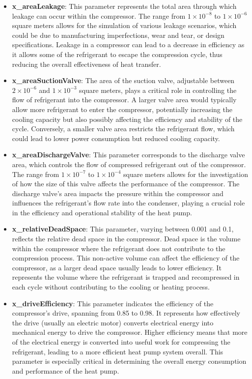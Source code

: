 \documentclass{report}
\begin{document}
\begin{itemize}
    \item \textbf{x\_areaLeakage}: This parameter represents the total area through which leakage can occur within the compressor. The range from \(1 \times 10^{-8}\) to \(1 \times 10^{-6}\) square meters allows for the simulation of various leakage scenarios, which could be due to manufacturing imperfections, wear and tear, or design specifications. Leakage in a compressor can lead to a decrease in efficiency as it allows some of the refrigerant to escape the compression cycle, thus reducing the overall effectiveness of heat transfer.

    \item \textbf{x\_areaSuctionValve}: The area of the suction valve, adjustable between \(2 \times 10^{-6}\) and \(1 \times 10^{-3}\) square meters, plays a critical role in controlling the flow of refrigerant into the compressor. A larger valve area would typically allow more refrigerant to enter the compressor, potentially increasing the cooling capacity but also possibly affecting the efficiency and stability of the cycle. Conversely, a smaller valve area restricts the refrigerant flow, which could lead to lower power consumption but reduced cooling capacity.

    \item \textbf{x\_areaDischargeValve}: This parameter corresponds to the discharge valve area, which controls the flow of compressed refrigerant out of the compressor. The range from \(1 \times 10^{-7}\) to \(1 \times 10^{-4}\) square meters allows for the investigation of how the size of this valve affects the performance of the compressor. The discharge valve's area impacts the pressure within the compressor and influences the refrigerant's flow rate into the condenser, playing a crucial role in the efficiency and operational stability of the heat pump.
    \item \textbf{x\_relativeDeadSpace}: This parameter, varying between 0.001 and 0.1, reflects the relative dead space in the compressor. Dead space is the volume within the compressor where the refrigerant does not contribute to the compression process. This non-active volume can affect the efficiency of the compressor, as a larger dead space usually leads to lower efficiency. It represents the volume where the refrigerant is trapped and recompressed in each cycle without contributing to the cooling or heating process.
    \item \textbf{x\_driveEfficiency}: This parameter indicates the efficiency of the compressor's drive, spanning from 0.85 to 0.98. It represents how effectively the drive (usually an electric motor) converts electrical energy into mechanical energy to drive the compressor. Higher efficiency means that more of the electrical energy is converted into useful work for compressing the refrigerant, leading to a more efficient heat pump system overall. This parameter is especially critical in determining the overall energy consumption and performance of the heat pump.
\end{itemize}
\end{document}
